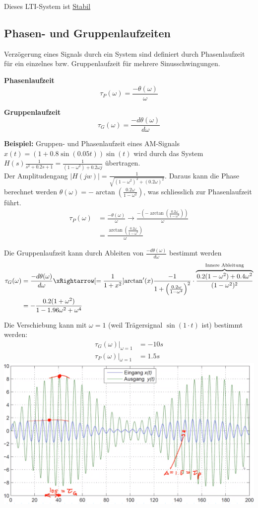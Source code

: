 Dieses LTI-System ist \underline{Stabil}

\subsection{Phasen- und Gruppenlaufzeiten}
Verzögerung eines Signals durch ein System sind definiert durch Phasenlaufzeit für ein einzelnes bzw. Gruppenlaufzeit für mehrere Sinusschwingungen.

\noindent\textbf{Phasenlaufzeit}
\[
\tau_P(\omega) = \frac{-\theta(\omega)}{\omega}
\]

\noindent\textbf{Gruppenlaufzeit}
\[
\tau_G(\omega) = \frac{-d\theta(\omega)}{d\omega}
\]

\textbf{Beispiel:} Gruppen- und Phasenlaufzeit eines AM-Signals $x(t) = (1+0.8\sin(0.05t))\sin(t)$ wird durch das System $H(s) \frac{1}{s^2 + 0.2s + 1} = \frac{1}{(1 -\omega^2) + 0.2\omega j}$ übertragen.\\
Der Amplitudengang $|H(jw)| = \frac{1}{\sqrt{(1-\omega^2)^2 + (0.2\omega)^2}}$. Daraus kann die Phase berechnet werden $\theta(\omega) = -\arctan\left(\frac{0.2\omega}{1-\omega^2}\right)$, was schliesslich zur Phasenlaufzeit führt.
\begin{align*}
	\tau_P(\omega) &= \frac{-\theta(\omega)}{\omega} \rightarrow \frac{-(-\arctan\left(\frac{0.2\omega}{1-\omega^2}\right))}{\omega} \\
	&= \frac{\arctan\left(\frac{0.2\omega}{1-\omega^2}\right)}{\omega} 
\end{align*}

Die Gruppenlaufzeit kann durch Ableiten von $\frac{-d\theta(\omega)}{d\omega}$ bestimmt werden
\begin{align*}
	\tau_G(\omega) &= \frac{-d\theta(\omega)}{d\omega} \xRightarrow[= \frac{1}{1+x^2}]{\arctan'(x)} \frac{-1}{1 + \left(\frac{0.2\omega}{1 - \omega^2}\right)^2} \cdot \overbrace{\frac{0.2(1-\omega^2) + 0.4\omega^2}{(1 - \omega^2)^2}}^\text{Innere Ableitung} \\
	&= -\frac{0.2(1+\omega^2)}{1-1.96\omega^2 + \omega^4}
\end{align*}


Die Verschiebung kann mit $\omega = 1$ (weil Trägersignal $\sin(1\cdot t)$ ist) bestimmt werden:
\begin{align*}
	\left.\tau_G(\omega)\right|_{\omega = 1} &= -10s \\
	\left.\tau_P(\omega)\right|_{\omega = 1} &= 1.5s 
\end{align*}
\includegraphics[width=\columnwidth]{Images/gruppenlaufzeit}


